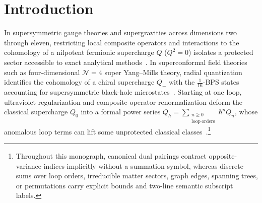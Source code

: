 \section{Introduction}
\label{sec:intro}

In supersymmetric gauge theories and supergravities across dimensions two through eleven, restricting local composite operators and interactions to the cohomology of a nilpotent fermionic supercharge $Q$ ($Q^2 = 0$) isolates a protected sector accessible to exact analytical methods~\cite{CDSW,CostelloNotes,SW,ESW}. In superconformal field theories such as four-dimensional $\mathcal{N}=4$ super Yang--Mills theory, radial quantization identifies the cohomology of a chiral supercharge $Q_-$ with the $\frac{1}{16}$-BPS states accounting for supersymmetric black-hole microstates~\cite{ChangYin,ChangLin}. Starting at one loop, ultraviolet regularization and composite-operator renormalization deform the classical supercharge $Q_0$ into a formal power series $Q_\hbar = \sum_{\substack{n \ge 0\\\mathrm{loop\ orders}}} \hbar^n Q_n$, whose anomalous loop terms can lift some unprotected classical classes~\cite{Konishi,BGKWWY,BK,LLC}.\footnote{Throughout this monograph, canonical dual pairings contract opposite-variance indices implicitly without a summation symbol, whereas discrete sums over loop orders, irreducible matter sectors, graph edges, spanning trees, or permutations carry explicit bounds and two-line semantic subscript labels.}

